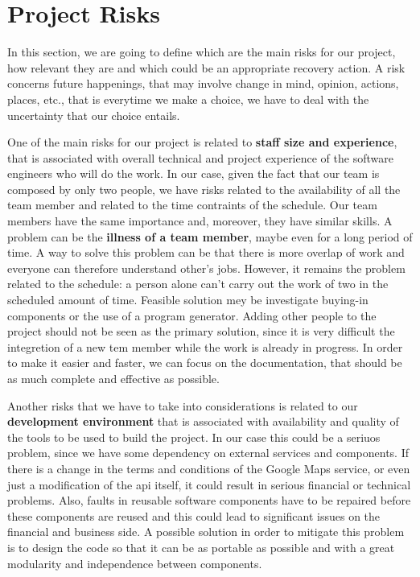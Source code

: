 \section{Project Risks} \label{sec:proj-risks}

In this section, we are going to define which are the main risks for our project, how relevant they are and which could be an appropriate recovery action.
A risk concerns future happenings, that may involve change in mind, opinion, actions, places, etc., that is everytime we make a choice, we have to deal with the uncertainty that our choice entails.

One of the main risks for our project is related to \textbf{staff size and experience}, that is associated with overall technical and project experience of the software engineers who will do the work. In our case, given the fact that our team is composed by only two people, we have risks related to the availability of all the team member and related to the time contraints of the schedule.
Our team members have the same importance and, moreover, they have similar skills. A problem can be the \textbf{illness of a team member}, maybe even for a long period of time. A way to solve this problem can be that there is more overlap of work and everyone can therefore understand other's jobs. However, it remains the problem related to the schedule: a person alone can't carry out the work of two in the scheduled amount of time. Feasible solution mey be investigate buying-in components or the use of a program generator. Adding other people to the project should not be seen as the primary solution, since it is very difficult the integretion of a new tem member while the work is already in progress. In order to make it easier and faster, we can focus on the documentation, that should be as much complete and effective as possible.

Another risks that we have to take into considerations is related to our \textbf{development environment} that is associated with availability and quality of the tools to be used to build the project. In our case this could be a seriuos problem, since we have some dependency on external services and components. If there is a change in the terms and conditions of the Google Maps service, or even just a modification of the \acs{api} itself, it could result in serious financial or technical problems. Also, faults in reusable software components have to be repaired before these components are reused and this could lead to significant issues on the financial and business side. A possible solution in order to mitigate this problem is to design the code so that it can be as portable as possible and with a great modularity and independence between components.

